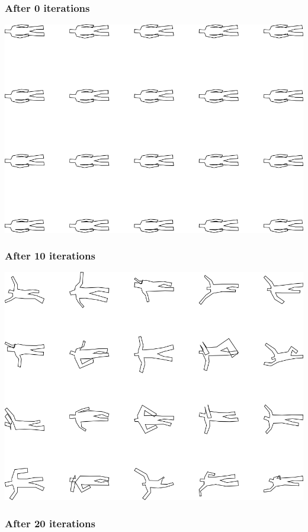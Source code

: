 \subsubsection{After 0 iterations}

\includegraphics[width=6in]{output/3.learning/correlated_tuning/correlated_tuning_iter0_.png}
\subsubsection{After 10 iterations}

\includegraphics[width=6in]{output/3.learning/correlated_tuning/correlated_tuning_iter10_.png}
\subsubsection{After 20 iterations}

